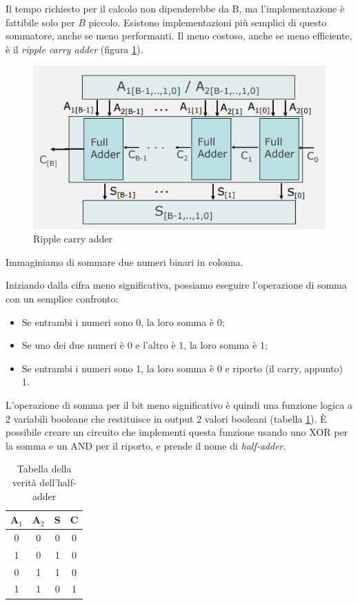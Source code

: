 \documentclass{article}
\begin{document}
Il tempo richiesto per il calcolo non dipenderebbe da B, ma l’implementazione è fattibile solo per $B$ piccolo. Esistono implementazioni più semplici di questo sommatore, anche se meno performanti. Il meno costoso, anche se meno efficiente, è il \textit{ripple carry adder} (figura \ref{ripple_carry_adder}).
\clearpage
\begin{figure}[h]
  \centering
  \includegraphics[scale=0.7]{IM_ripple_carry_adder}
  \caption{Ripple carry adder}
  \label{ripple_carry_adder}
\end{figure}

Immaginiamo di sommare due numeri binari in colonna.

\vspace{1mm}

Iniziando dalla cifra meno significativa, possiamo eseguire l'operazione di somma con un semplice confronto:
\begin{itemize}
  \item [\textendash] Se entrambi i numeri sono 0, la loro somma è 0;
  \item [\textendash] Se uno dei due numeri è 0 e l'altro è 1, la loro somma è 1;
  \item [\textendash] Se entrambi i numeri sono 1, la loro somma è 0 e riporto (il carry, appunto) 1.
\end{itemize}

L'operazione di somma per il bit meno significativo è quindi una funzione logica a 2 variabili booleane che restituisce in output 2 valori booleani (tabella \ref{Tabella_half_adder}). È possibile creare un circuito che implementi questa funzione usando uno XOR per la somma e un AND per il riporto, e prende il nome di \textit{half-adder}.

\begin{table}[h]
  \centering
  \begin{tabular}{| c | c || c | c |}
  \hline
  A$_1$ & A$_2$ & S & C \\ \hline
  0 & 0 & 0 & 0 \\ \hline
  1 & 0 & 1 & 0 \\ \hline
  0 & 1 & 1 & 0 \\ \hline
  1 & 1 & 0 & 1 \\ \hline
  \end{tabular}
  \caption{Tabella della verità dell'half-adder}
  \label{Tabella_half_adder}
\end{table}
\end{document}
